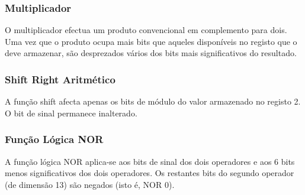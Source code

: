 \documentclass[a4paper]{article}
\begin{document}
\subsubsection{Multiplicador}
O multiplicador efectua um produto convencional em complemento para dois. Uma vez que o produto ocupa mais bits que aqueles disponíveis no registo que o deve armazenar, são desprezados vários dos bits mais significativos do resultado.

\subsubsection{Shift Right Aritmético}
A função shift afecta apenas os bits de módulo do valor armazenado no registo 2. O bit de sinal permanece inalterado.

\subsubsection{Função Lógica NOR}
A função lógica NOR aplica-se aos bits de sinal dos dois operadores e aos 6 bits menos significativos dos dois operadores. Os restantes bits do segundo operador (de dimensão 13) são negados (isto é, NOR 0).
\end{document}

